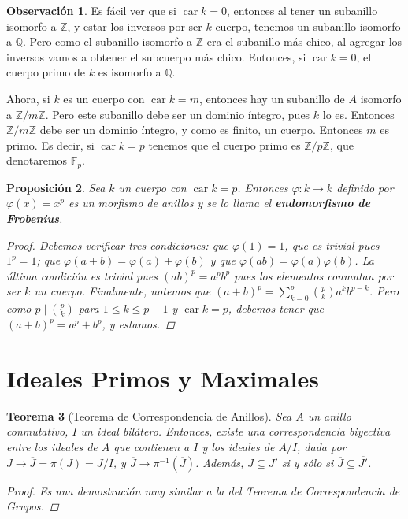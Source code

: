 \documentclass[12pt]{book}
\newtheorem{teo}{Teorema}[section]
\newtheorem{prop}[teo]{Proposición}
\theoremstyle{definition}
\newtheorem{obs}[teo]{Observación}
\newcommand{\ZZ}{\mathbb{Z}}      %
\newcommand{\QQ}{\mathbb{Q}}
\DeclareMathOperator{\car}{car}
\begin{document}
\begin{obs}
Es fácil ver que si $\car k = 0$, entonces al tener un subanillo isomorfo a $\ZZ$, y estar los inversos por ser $k$ cuerpo, tenemos un subanillo isomorfo a $\QQ$. Pero como el subanillo isomorfo a $\ZZ$ era el subanillo más chico, al agregar los inversos vamos a obtener el subcuerpo más chico. Entonces, si $\car k = 0$, el cuerpo primo de $k$ es isomorfo a $\QQ$.

Ahora, si $k$ es un cuerpo con $\car k = m$, entonces hay un subanillo de $A$ isomorfo a $\ZZ/m\ZZ$. Pero este subanillo debe ser un dominio íntegro, pues $k$ lo es. Entonces $\ZZ/m\ZZ$ debe ser un dominio íntegro, y como es finito, un cuerpo. Entonces $m$ es primo. Es decir, si $\car k = p$ tenemos que el cuerpo primo es $\ZZ/p\ZZ$, que denotaremos $\mathbb{F}_p$.
\end{obs}

\begin{prop}
Sea $k$ un cuerpo con $\car k = p$. Entonces  $\varphi:k\to k$ definido por $\varphi(x)=x^p$ es un morfismo de anillos y se lo llama el \textbf{endomorfismo de Frobenius}.
\begin{proof}
Debemos verificar tres condiciones: que $\varphi(1)=1$, que es trivial pues $1^p = 1$; que $\varphi(a+b)=\varphi(a) + \varphi(b)$ y que $\varphi(ab)=\varphi(a)\varphi(b)$. La última condición es trivial pues $(ab)^p = a^p b^p$ pues los elementos conmutan por ser $k$ un cuerpo. Finalmente, notemos que $(a+b)^p = \displaystyle\sum_{k=0}^p \displaystyle\binom{p}{k} a^k b^{p-k}$. Pero como $p\mid \displaystyle\binom{p}{k}$ para $1\leq k\leq p-1$ y $\car k = p$, debemos tener que $(a+b)^p = a^p + b^p$, y estamos.
\end{proof}
\end{prop}

\section{Ideales Primos y Maximales}

\begin{teo}[Teorema de Correspondencia de Anillos]
Sea $A$ un anillo conmutativo, $I$ un ideal bilátero. Entonces, existe una correspondencia biyectiva entre los ideales de $A$ que contienen a $I$ y los ideales de $A/I$, dada por $J\to \overline{J}=\pi (J)=J/I$, y $\overline{J}\to\pi^{-1}(\overline{J})$. Además, $J\subseteq J'$ si y sólo si $\overline{J}\subseteq \overline{J'}$.
\begin{proof}
Es una demostración muy similar a la del Teorema de Correspondencia de Grupos.
\end{proof}
\end{teo}
\end{document}
